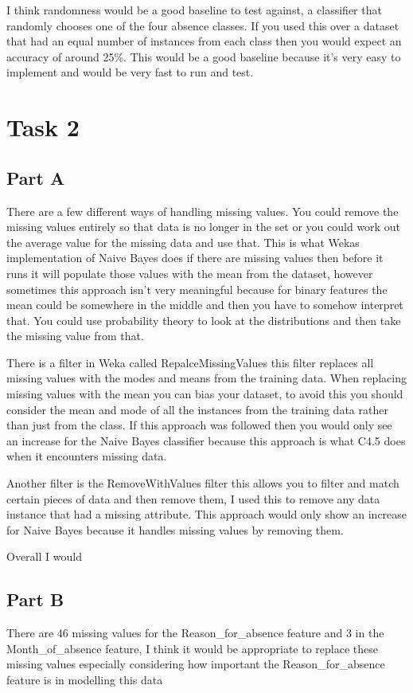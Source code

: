 \documentclass[10pt]{article}
\begin{document}
I think randomness would be a good baseline to test against, a classifier that randomly chooses one of the four absence classes. If you used this over a dataset that had an equal number of instances from each class then you would expect an accuracy of around 25\%. This would be a good baseline because it's very easy to implement and would be very fast to run and test.

\section*{Task 2}

\subsection*{Part A}
There are a few different ways of handling missing values. You could remove the missing values entirely so that data is no longer in the set or you could work out the average value for the missing data and use that. This is what Wekas implementation of Naive Bayes does if there are missing values then before it runs it will populate those values with the mean from the dataset, however sometimes this approach isn't very meaningful because for binary features the mean could be somewhere in the middle and then you have to somehow interpret that. You could use probability theory to look at the distributions and then take the missing value from that.

There is a filter in Weka called RepalceMissingValues this filter replaces all missing values  with the modes and means from the training data. When replacing missing values with the mean you can bias your dataset, to avoid this you should consider the mean and mode of all the instances from the training data rather than just from the class. If this approach was followed then you would only see an increase for the Naive Bayes classifier because this approach is what C4.5 does when it encounters missing data.

Another filter is the RemoveWithValues filter this allows you to filter and match certain pieces of data and then remove them, I used this to remove any data instance that had a missing attribute. This approach would only show an increase for Naive Bayes because it handles missing values by removing them.

Overall I would 

\subsection*{Part B}
There are 46 missing values for the Reason\_for\_absence feature and 3 in the Month\_of\_absence feature, I think it would be appropriate to replace these missing values especially considering how important the Reason\_for\_absence feature is in modelling this data
\end{document}

